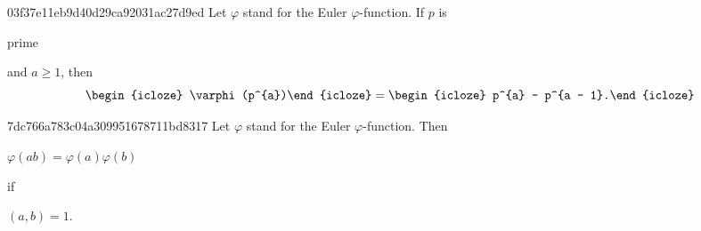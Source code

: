 \begin{note}{03f37e11eb9d40d29ca92031ac27d9ed}
    Let \({ \varphi }\) stand for the Euler \({ \varphi }\)-function.
    If \({ p }\) is \begin{icloze}{3}prime\end{icloze} and \({ a \geq 1 }\), then
    \[
        \begin{icloze}{2}\varphi(p^{a})\end{icloze} = \begin{icloze}{1}p^{a} - p^{a - 1}.\end{icloze}
    \]
\end{note}

\begin{note}{7dc766a783c04a309951678711bd8317}
    Let \({ \varphi }\) stand for the Euler \({ \varphi }\)-function.
    Then
    \begin{center}
        \begin{icloze}{1}\({ \varphi(ab) = \varphi(a) \varphi(b) }\)\end{icloze} \quad if \begin{icloze}{2}\({ (a, b) = 1 }\).\end{icloze}
    \end{center}
\end{note}


